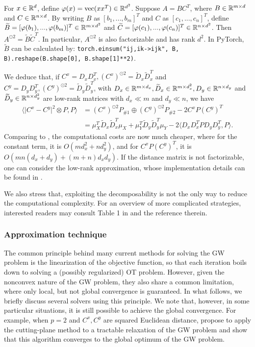 \begin{lemma}
  For $x \in \mathbb R^d$, define $\varphi(x) = \text{vec}(xx^T) \in \mathbb R^{d^2}$.
  Suppose $A = B C^T$, where $B \in \mathbb R^{m \times d}$ and $C \in \mathbb R^{n \times d}$.
  By writing $B$ as $[b_1, ..., b_m]^T$ and $C$ as $[c_1, ..., c_n]^T$, define
  $\widetilde{B} = [\varphi(b_1), ..., \varphi(b_m)]^T \in \mathbb R^{m \times d^2}$ and
  $\widetilde{C} = [\varphi(c_1), ..., \varphi(c_n)]^T \in \mathbb R^{n \times d^2}$.
  Then $A^{\odot 2} = \widetilde{B} \widetilde{C}^T$. In particular, $A^{\odot 2}$ is also
  factorizable and has rank $d^2$. In PyTorch, $\widetilde{B}$ can be calculated by:
  \texttt{torch.einsum("ij,ik->ijk", B, B).reshape(B.shape[0], B.shape[1]**2)}.
\end{lemma}
We deduce that, if $C^x = D_x D_x^T, (C^x)^{\odot 2} = \widetilde{D}_x \widetilde{D}_x^T$
and $C^y = D_y D_y^T, (C^y)^{\odot 2} = \widetilde{D}_y \widetilde{D}_y^T$,
with $D_x \in \mathbb R^{m \times d_x}, \widetilde{D}_x \in \mathbb R^{m \times d_x^2},
D_y \in \mathbb R^{n \times d_y}$ and $\widetilde{D}_y \in \mathbb R^{n \times d_y^2}$ are low-rank matrices
with $d_x \ll m$ and $d_y \ll n$, we have
\begin{align}
  \langle \vert C^x - C^y \vert^2 \otimes P, P \rangle
  &= (C^x)^{\odot 2} P_{\# 1} \oplus (C^y)^{\odot 2} P_{\# 2} - 2 C^x P (C^y)^T \\
  &= \mu_X^T \widetilde{D}_x \widetilde{D}_x^T \mu_X
  + \mu_Y^T \widetilde{D}_y \widetilde{D}_y^T \mu_Y - 2 \langle D_x D_x^T P D_y D_y^T, P \rangle.
\end{align}
Comparing to , the computational costs are now much cheaper,
where for the constant term, it is $O(m d_x^2 + n d_y^2)$, and for $C^x P (C^y)^T$,
it is $O(mn(d_x + d_y) + (m+n) d_x d_y)$. If the distance matrix is not factorizable,
one can consider the low-rank approximation,
whose implementation details can be found in \citep{Meyer21a}.

We also stress that, exploiting the decomposability is not the only way to reduce the computational
complexity. For an overview of more complicated strategies,
interested readers may consult Table 1 in \citep{Li23} and the reference therein.

\subsubsection{Approximation technique} \label{subsec:gw_approx}
The common principle behind many current methods for solving the GW problem
is the linearization of the objective function,
so that each iteration boils down to solving a (possibly regularized)
OT problem. However, given the nonconvex nature of the GW problem, they also share
a common limitation, where only local, but not global convergence is guaranteed.
In what follows, we briefly discuss several solvers using this principle.
We note that, however, in some particular situations, it is still possible to achieve the
global convergence. For example, when $p=2$ and $C^x, C^y$ are squared Euclidean distance,
\citet{Ryner23} propose to apply the cutting-plane method to a tractable relaxation of the GW problem
and show that this algorithm converges to the global optimum of the GW problem.

